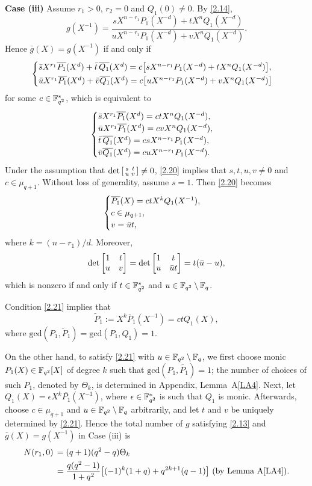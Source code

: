 \documentclass{amsart}
\numberwithin{equation}{section}
\theoremstyle{definition}
\newcommand{\f}{\Bbb F}
\begin{document}
\medskip
{\bf Case (iii)} Assume $r_1>0$, $r_2=0$ and $Q_1(0)\ne 0$. By \eqref{2.14},
\[
g(X^{-1})=\frac{sX^{n-r_1}P_1(X^{-d})+tX^nQ_1(X^{-d})}{uX^{n-r_1}P_1(X^{-d})+vX^nQ_1(X^{-d})}.
\]
Hence $\bar g(X)=g(X^{-1})$ if and only if
\[
\begin{cases}
\bar sX^{r_1}\overline{P_1}(X^{d})+\bar t\,\overline{Q_1}(X^{d})=c\bigl[sX^{n-r_1}P_1(X^{-d})+tX^nQ_1(X^{-d}) \bigr],\vspace{0.2em}\cr
\bar uX^{r_1}\overline{P_1}(X^{d})+\bar v\overline{Q_1}(X^{d})=c\bigl[uX^{n-r_1}P_1(X^{-d})+vX^nQ_1(X^{-d}) \bigr]
\end{cases}
\]
for some $c\in\f_{q^2}^*$, which is equivalent to
\begin{equation}\label{2.20}
\begin{cases}
\bar sX^{r_1}\overline{P_1}(X^d)=ctX^nQ_1(X^{-d}),\cr
\bar uX^{r_1}\overline{P_1}(X^d)=cvX^nQ_1(X^{-d}),\cr
\bar t\,\overline{Q_1}(X^d)=csX^{n-r_1}P_1(X^{-d}),\cr
\bar v\overline{Q_1}(X^d)=cuX^{n-r_1}P_1(X^{-d}).
\end{cases}
\end{equation}
Under the assumption that $\det\left[\begin{smallmatrix}s&t\cr u&v\end{smallmatrix}\right]\ne 0$, \eqref{2.20} implies that $s,t,u,v\ne 0$ and $c\in\mu_{q+1}$. Without loss of generality, assume $s=1$. Then \eqref{2.20} becomes
\begin{equation}\label{2.21}
\begin{cases}
\overline{P_1}(X)=ctX^kQ_1(X^{-1}),\cr
c\in\mu_{q+1},\cr
v=\bar ut,
\end{cases}
\end{equation}
where $k=(n-r_1)/d$. Moreover, 
\[
\det\left[\begin{matrix}1&t\cr u&v\end{matrix}\right]=\det\left[\begin{matrix}1&t\cr u&\bar ut\end{matrix}\right]=t(\bar u-u),
\]
which is nonzero if and only if $t\in\f_{q^2}^*$ and $u\in\f_{q^2}\setminus\f_q$.

Condition \eqref{2.21} implies that
\[
\widetilde P_1:=X^k\overline P_1(X^{-1})=ctQ_1(X),
\]
where $\text{gcd}(P_1,\widetilde P_1)=\text{gcd}(P_1,Q_1)=1$.

On the other hand, to satisfy \eqref{2.21} with $u\in\f_{q^2}\setminus\f_q$, we first choose monic $P_1(X)\in\f_{q^2}[X]$ of degree $k$ such that  $\text{gcd}(P_1,\widetilde{P_1})=1$; the number of choices of such $P_1$, denoted by $\Theta_k$, is determined in Appendix, Lemma~A\ref{LA4}. Next,  let $Q_1(X)=\epsilon X^k\overline{P_1}(X^{-1})$, where $\epsilon\in\f_{q^2}^*$ is such that $Q_1$ is monic. Afterwards, choose $c\in\mu_{q+1}$ and $u\in\f_{q^2}\setminus\f_q$ arbitrarily, and let $t$ and $v$ be uniquely determined by \eqref{2.21}. Hence the total number of $g$ satisfying \eqref{2.13} and $\bar g(X)=g(X^{-1})$ in Case (iii) is
\begin{align}\label{case3}
N(r_1,0)\,
&=(q+1)(q^2-q)\Theta_k\\
&=\frac{q(q^2-1)}{1+q^2}\bigl[(-1)^k(1+q)+q^{2k+1}(q-1)\bigr]\ \text{(by Lemma~A\ref{LA4})}.\nonumber
\end{align}
\end{document}
